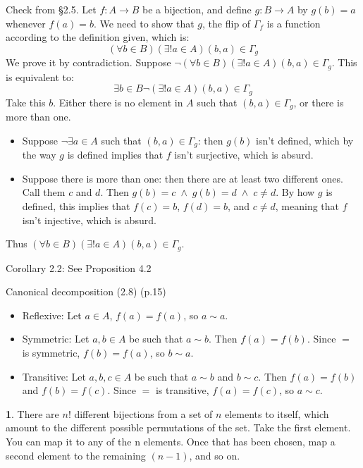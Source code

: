 \documentclass{article}
\theoremstyle{definition}
\newcommand{\AND}{\;\wedge\;}
\theoremstyle{definition}
\theoremstyle{definition}
\newtheorem{solution-internal}{}[subsection]
\newenvironment{solution}{
  \medskip
  \begin{solution-internal}
}{
  \end{solution-internal}
}
\begin{document}
Check from \S 2.5.
Let $f \colon A \to B$ be a bijection, and define $g \colon B \to A$ by $g(b)=a$ whenever $f(a)=b$. We need to show that $g$, the flip of $\Gamma_f$ is a
function according to the definition given, which is: 
\[ (\forall b \in B)(\exists! a \in A) (b,a) \in \Gamma_g \]
We prove it by contradiction. Suppose $\neg (\forall b \in B)(\exists! a \in A)
(b,a) \in \Gamma_g$. This is equivalent to:
\[ \exists b \in B \neg (\exists! a \in A) (b,a) \in \Gamma_g \]
Take this $b$. Either there is no element in $A$ such that $(b,a) \in \Gamma_g$, or there is more than one.
\begin{itemize}
\item Suppose $\neg \exists a \in A$ such that $(b,a) \in \Gamma_g$: then
$g(b)$ isn't defined, which by the way $g$ is defined implies that $f$ isn't
surjective, which is absurd.
\item Suppose there is more than one: then there are at least two different ones. Call them $c$ and $d$. Then $g(b) = c \AND g(b) = d \AND c \neq d$. By how $g$ is defined, this implies that $f(c) = b$, $f(d) = b$, and $c \neq d$, meaning that $f$ isn't injective, which is absurd.
\end{itemize}
Thus $(\forall b \in B)(\exists! a \in A) (b,a) \in \Gamma_g$.

Corollary 2.2: See Proposition 4.2

Canonical decomposition (2.8) (p.15)
\begin{itemize}
\item Reflexive: Let $a \in A$, $f(a) = f(a)$, so $a \sim a$.
\item Symmetric: Let $a, b \in A$ be such that $a \sim b$. Then $f(a) = f(b)$. Since $=$ is symmetric, $f(b) = f(a)$, so $b \sim a$.
\item Transitive: Let $a, b, c \in A$ be such that $a \sim b$ and $b \sim c$. Then $f(a) = f(b)$ and $f(b) = f(c)$. Since $=$ is transitive, $f(a) = f(c)$, so $a \sim c$.
\end{itemize}

\begin{solution}
There are $n!$ different bijections from a set of $n$ elements to itself, which
amount to the different possible permutations of the set. Take the first
element. You can map it to any of the n elements. Once that has been chosen,
map a second element to the remaining $(n-1)$, and so on.
\end{solution}
\end{document}

